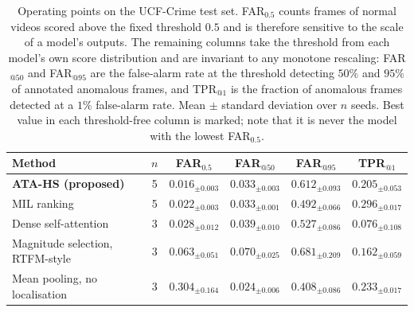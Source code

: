\begin{table}[htbp]
\centering
\caption{Operating points on the UCF-Crime test set. FAR$_{0.5}$ counts frames of normal videos scored above the fixed threshold $0.5$ and is therefore sensitive to the scale of a model's outputs. The remaining columns take the threshold from each model's own score distribution and are invariant to any monotone rescaling: FAR$_{@50}$ and FAR$_{@95}$ are the false-alarm rate at the threshold detecting $50\%$ and $95\%$ of annotated anomalous frames, and TPR$_{@1}$ is the fraction of anomalous frames detected at a $1\%$ false-alarm rate. Mean $\pm$ standard deviation over $n$ seeds. Best value in each threshold-free column is marked; note that it is never the model with the lowest FAR$_{0.5}$.}
\label{tab:threshold}
\small
\begin{tabular}{lccccc}
\toprule
Method & $n$ & FAR$_{0.5}$ & FAR$_{@50}$ & FAR$_{@95}$ & TPR$_{@1}$ \\
\midrule
\textbf{ATA-HS (proposed)} & 5 & $0.016_{\pm0.003}$ & $0.033_{\pm0.003}$ & $0.612_{\pm0.093}$ & $0.205_{\pm0.053}$ \\
\midrule
MIL ranking \citep{sultani2018real} & 5 & $0.022_{\pm0.003}$ & $0.033_{\pm0.001}$ & $0.492_{\pm0.066}$ & $\mathbf{0.296}_{\pm0.017}$ \\
Dense self-attention & 3 & $0.028_{\pm0.012}$ & $0.039_{\pm0.010}$ & $0.527_{\pm0.086}$ & $0.076_{\pm0.108}$ \\
Magnitude selection, RTFM-style \citep{tian2021weakly} & 3 & $0.063_{\pm0.051}$ & $0.070_{\pm0.025}$ & $0.681_{\pm0.209}$ & $0.162_{\pm0.059}$ \\
Mean pooling, no localisation & 3 & $0.304_{\pm0.164}$ & $0.024_{\pm0.006}$ & $\mathbf{0.408}_{\pm0.086}$ & $0.233_{\pm0.017}$ \\
\bottomrule
\end{tabular}
\end{table}
